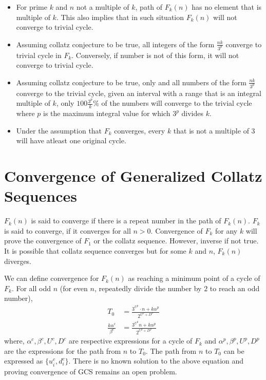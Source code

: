\documentclass[12pt]{article} %
\begin{document}
\begin{itemize}
   \item For prime $k$ and $n$ not a multiple of $k$, path of $F_k(n)$ has no element that is multiple of $k$. This also implies that in such situation $F_k(n)$ will not converge to trivial cycle. 
   
   \item Assuming collatz conjecture to be true, all integers of the form $\frac{nk}{3^p}$ converge to trivial cycle in $F_k$. Conversely, if number is not of this form, it will not converge to trivial cycle.
   
   \item Assuming collatz conjecture to be true, only and all numbers of the form $\frac{nk}{3^{p}}$ converge to the trivial cycle, given an interval with a range that is an integral multiple of $k$, only $100\frac{3^p}{k}\%$ of the numbers will converge to the trivial cycle where $p$ is the maximum integral value for which $3^p$ divides $k$. 
    
    \item Under the assumption that $F_k$ converges, every $k$ that is not a multiple of $3$ will have atleast one original cycle.
\end{itemize}
 
   
 

\section{Convergence of Generalized Collatz Sequences}

$F_k(n)$ is said to converge if there is a repeat number in the path of $F_k(n)$. $F_k$ is said to converge, if it converges for all $n > 0$. Convergence of $F_k$ for any $k$ will prove the convergence of $F_1$ or the collatz sequence. However, inverse if not true. It is possible that collatz sequence converges but for some $k$ and $n$, $F_k(n)$ diverges.

We can define convergence for $F_k(n)$ as reaching a minimum point of a cycle of $F_k$. For all odd $n$ (for even $n$, repeatedly divide the number by $2$ to reach an odd number), 
\begin{align*}
T_0 & = \frac{3^{U^p} \cdot n + k \alpha^p}{2^{U^p + D^p}}\\
\frac{k \alpha^c}{\beta^c} & = \frac{3^{U^p} n + k \alpha^p}{2^{U^p + D^p}}
\end{align*}
where, $\alpha^c, \beta^c, U^c, D^c$ are respective expressions for a cycle of $F_k$ and $\alpha^p, \beta^p, U^p, D^p$ are the expressions for the path from $n$ to $T_0$. The path from $n$ to $T_0$ can be expressed as $\{u^c_i, d^c_i\}$. There is no known solution to the above equation and proving convergence of GCS remains an open problem.
\end{document}
